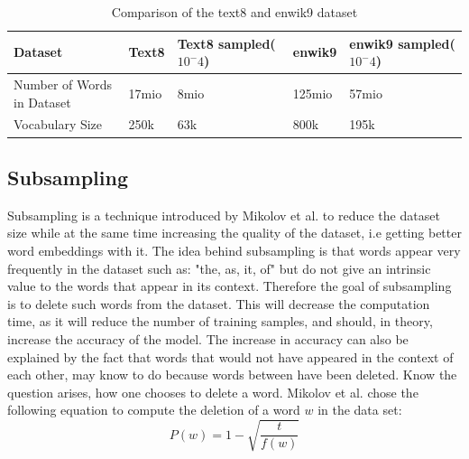 \begin{table}[]
\centering
\begin{tabular}{|l|l|l|l|l|}
\hline
Dataset                    & Text8 & Text8 sampled($10^-4$)& enwik9 & enwik9 sampled($10^-4$)\\ \hline
Number of Words in Dataset & 17mio & 8mio  & 125mio  &57mio\\ \hline
Vocabulary Size            & 250k & 63k  & 800k &195k   \\ \hline
\end{tabular}
\caption{Comparison of the text8 and enwik9 dataset}
    \label{table:t8_e9_comp}
\end{table}
 
 
\subsection{Subsampling}
Subsampling is a technique introduced by Mikolov et al. \cite{mikolov} to reduce the dataset size while at the same time increasing the quality of the dataset, i.e getting better word embeddings with it. The idea behind subsampling is that words appear very frequently in the dataset such as: "the, as, it, of" but do not give an intrinsic value to the words that appear in its context. Therefore the goal of subsampling is to delete such words from the dataset. This will decrease the computation time, as it will reduce the number of training samples, and should, in theory, increase the accuracy of the model. The increase in accuracy can also be explained by the fact that words that would not have appeared in the context of each other, may know to do because words between have been deleted.
Know the question arises, how one chooses to delete a word. Mikolov et al. chose the following equation to compute the deletion of a word $w$ in the data set:
\begin{equation} \label{eq:sampling}
P(w) = 1- \sqrt{{\frac{t}{f(w)}}}
\end{equation}

